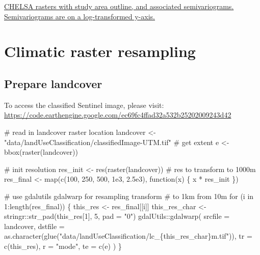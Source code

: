 \documentclass[]{article}
\newenvironment{Shaded}{}{}
\newcommand{\CommentTok}[1]{\textcolor[rgb]{0.00,0.50,0.00}{#1}}
\newcommand{\ControlFlowTok}[1]{\textcolor[rgb]{0.00,0.00,1.00}{#1}}
\newcommand{\DataTypeTok}[1]{#1}
\newcommand{\DecValTok}[1]{#1}
\newcommand{\FloatTok}[1]{#1}
\newcommand{\KeywordTok}[1]{\textcolor[rgb]{0.00,0.00,1.00}{#1}}
\newcommand{\NormalTok}[1]{#1}
\newcommand{\OperatorTok}[1]{#1}
\newcommand{\StringTok}[1]{\textcolor[rgb]{0.00,0.50,0.50}{#1}}
\begin{document}
\href{figs/fig_chelsa_variograms.png}{CHELSA rasters with study area outline, and associated semivariograms. Semivariograms are on a log-transformed y-axis.}

\hypertarget{climatic-raster-resampling}{%
\section{Climatic raster resampling}\label{climatic-raster-resampling}}

\hypertarget{prepare-landcover}{%
\subsection{Prepare landcover}\label{prepare-landcover}}

To access the classified Sentinel image, please visit: \url{https://code.earthengine.google.com/ec69fc4ffad32a532b25202009243d42}

\begin{Shaded}
\begin{Highlighting}[numbers=left,,]
\CommentTok{# read in landcover raster location}
\NormalTok{landcover <-}\StringTok{ "data/landUseClassification/classifiedImage-UTM.tif"}
\CommentTok{# get extent}
\NormalTok{e <-}\StringTok{ }\KeywordTok{bbox}\NormalTok{(}\KeywordTok{raster}\NormalTok{(landcover))}

\CommentTok{# init resolution}
\NormalTok{res_init <-}\StringTok{ }\KeywordTok{res}\NormalTok{(}\KeywordTok{raster}\NormalTok{(landcover))}
\CommentTok{# res to transform to 1000m}
\NormalTok{res_final <-}\StringTok{ }\KeywordTok{map}\NormalTok{(}\KeywordTok{c}\NormalTok{(}\DecValTok{100}\NormalTok{, }\DecValTok{250}\NormalTok{, }\DecValTok{500}\NormalTok{, }\FloatTok{1e3}\NormalTok{, }\FloatTok{2.5e3}\NormalTok{), }\ControlFlowTok{function}\NormalTok{(x) \{}
\NormalTok{  x }\OperatorTok{*}\StringTok{ }\NormalTok{res_init}
\NormalTok{\})}

\CommentTok{# use gdalutils gdalwarp for resampling transform}
\CommentTok{# to 1km from 10m}
\ControlFlowTok{for}\NormalTok{ (i }\ControlFlowTok{in} \DecValTok{1}\OperatorTok{:}\KeywordTok{length}\NormalTok{(res_final)) \{}
\NormalTok{  this_res <-}\StringTok{ }\NormalTok{res_final[[i]]}
\NormalTok{  this_res_char <-}\StringTok{ }\NormalTok{stringr}\OperatorTok{::}\KeywordTok{str_pad}\NormalTok{(this_res[}\DecValTok{1}\NormalTok{], }\DecValTok{5}\NormalTok{, }\DataTypeTok{pad =} \StringTok{"0"}\NormalTok{)}
\NormalTok{  gdalUtils}\OperatorTok{::}\KeywordTok{gdalwarp}\NormalTok{(}
    \DataTypeTok{srcfile =}\NormalTok{ landcover,}
    \DataTypeTok{dstfile =} \KeywordTok{as.character}\NormalTok{(}\KeywordTok{glue}\NormalTok{(}\StringTok{"data/landUseClassification/lc_\{this_res_char\}m.tif"}\NormalTok{)),}
    \DataTypeTok{tr =} \KeywordTok{c}\NormalTok{(this_res), }\DataTypeTok{r =} \StringTok{"mode"}\NormalTok{, }\DataTypeTok{te =} \KeywordTok{c}\NormalTok{(e)}
\NormalTok{  )}
\NormalTok{\}}
\end{Highlighting}
\end{Shaded}
\end{document}
